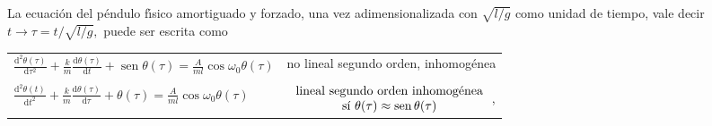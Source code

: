 \documentclass[spanish,titlepage,11pt]{article}
\begin{document}
La ecuaci\'{o}n del p\'{e}ndulo f\'{\i}sico amortiguado y forzado, una vez
adimensionalizada con $\sqrt{l/g}$ como unidad de tiempo, vale decir
$t\rightarrow\tau=t/\sqrt{l/g},$ puede ser escrita como\newline
\begin{tabular}
[c]{ll}%
$\frac{\mathrm{d}^{2}\theta(\tau)}{\mathrm{d}\tau^{2}}+\frac{k}{m}%
\frac{\mathrm{d}\theta(\tau)}{\mathrm{d}t}+\operatorname*{sen}\theta
(\tau)=\frac{A}{ml}\cos\omega_{0}\theta(\tau)$ & no lineal segundo orden,
inhomog\'{e}nea\\
& \\
$\frac{\mathrm{d}^{2}\theta(t)}{\mathrm{d}t^{2}}+\frac{k}{m}\frac
{\mathrm{d}\theta(\tau)}{\mathrm{d}\tau}+\theta(\tau)=\frac{A}{ml}\cos
\omega_{0}\theta(\tau)$ & $\left.
\begin{array}
[c]{c}%
\text{lineal segundo orden inhomog\'{e}nea}\\
\text{s\'{\i} }\theta(\tau)\approx\operatorname*{sen}\theta(\tau)
\end{array}
\right.  $,
\end{tabular}
\end{document}
